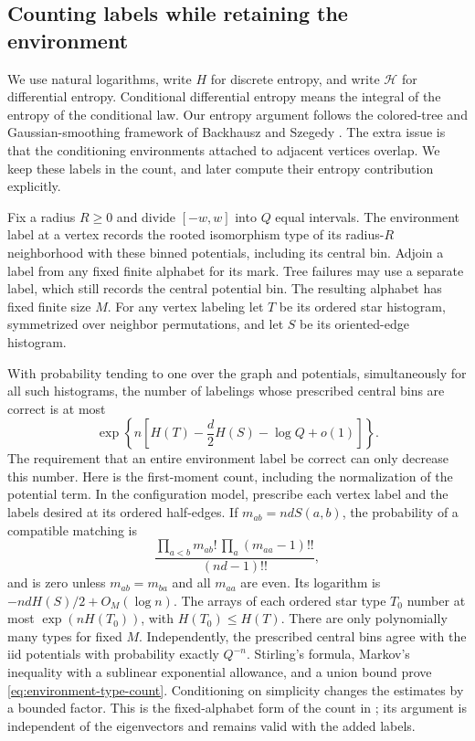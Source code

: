 \subsection{Counting labels while retaining the environment}

We use natural logarithms, write \(H\) for discrete entropy, and
write \(\mathcal H\) for differential entropy.  Conditional
differential entropy means the integral of the entropy of the
conditional law.  Our entropy argument follows the colored-tree and
Gaussian-smoothing framework of Backhausz and Szegedy
\cite[Theorems~6.1 and 8.1]{BackhauszSzegedy2019}.  The extra issue is
that the conditioning environments attached to adjacent vertices
overlap.  We keep these labels in the count, and later compute their
entropy contribution explicitly.

Fix a radius \(R\ge0\) and divide \([-w,w]\) into \(Q\) equal
intervals.  The environment label at a vertex records the rooted
isomorphism type of its radius-\(R\) neighborhood with these binned
potentials, including its central bin.  Adjoin a label from any
fixed finite alphabet for its mark.  Tree failures may use a separate
label, which still records the central potential bin.  The resulting
alphabet has fixed finite size \(M\).
For any vertex labeling let \(T\) be its ordered star histogram,
symmetrized over neighbor permutations, and let \(S\) be its
oriented-edge histogram.

With probability tending to one over the graph and potentials,
simultaneously for all such histograms, the number of labelings
whose prescribed central bins are correct is at most
\begin{equation}\label{eq:environment-type-count}
 \exp\left\{n\left[H(T)-\frac d2H(S)-\log Q+o(1)\right]\right\}.
\end{equation}
The requirement that an entire environment label be correct can only
decrease this number.  Here is the first-moment count, including the
normalization of the potential term.  In the configuration model,
prescribe each vertex label and the labels desired at its ordered
half-edges.  If \(m_{ab}=ndS(a,b)\), the probability of a compatible
matching is
\[
 \frac{\prod_{a<b}m_{ab}!\,\prod_a(m_{aa}-1)!!}{(nd-1)!!},
\]
and is zero unless \(m_{ab}=m_{ba}\) and all \(m_{aa}\) are even.
Its logarithm is \(-ndH(S)/2+O_M(\log n)\).  The arrays of each
ordered star type \(T_0\) number at most \(\exp(nH(T_0))\), with
\(H(T_0)\le H(T)\).  There are only polynomially many types for
fixed \(M\).  Independently, the prescribed central bins agree with
the iid potentials with probability exactly \(Q^{-n}\).
Stirling's formula, Markov's inequality with a sublinear exponential
allowance, and a union bound prove \eqref{eq:environment-type-count}.
Conditioning on simplicity changes the estimates by a bounded factor.
This is the fixed-alphabet form of the count in
\cite[Section~3.1, Lemma~3.2]{bu}; its argument is independent of the
eigenvectors and remains valid with the added labels.

